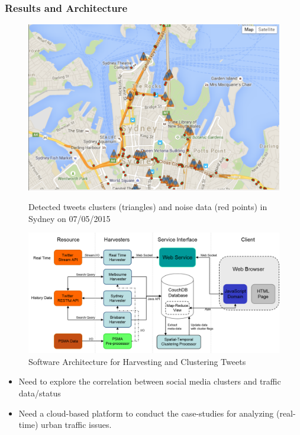 \begin{frame}
    \frametitle{Results and Architecture}
    \begin{figure}[h]
       \begin{minipage}{0.5\linewidth}
         \centering
         \includegraphics[width=.8\linewidth]{resource/figures/harvester_cluster_3.png}
         \caption{Detected tweets clusters (triangles) and noise data (red points) in Sydney on 07/05/2015}
       \end{minipage}\hfill
       \begin{minipage}{0.5\linewidth}
         \centering
         \includegraphics[width=.8\linewidth]{resource/figures/harvester_architecture.png}
         \caption{Software Architecture for Harvesting and Clustering Tweets}
       \end{minipage}
    \end{figure}
    \vspace{-0.3cm}
    \begin{itemize}
        \item Need to explore the correlation between social media clusters and traffic data/status
        \item Need a cloud-based platform to conduct the case-studies for analyzing (real-time) urban traffic issues.
    \end{itemize}
\end{frame}

